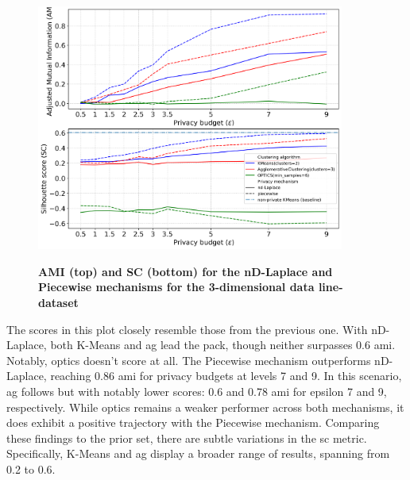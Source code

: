 \begin{figure}[H]
  \centering
  \caption{\textbf{AMI (top) and SC (bottom) for the nD-Laplace and Piecewise mechanisms for the 3-dimensional data line-dataset}}
  \includegraphics[width=0.9\textwidth]{Results/nd-laplace/nd-Laplace/line-dataset/ami-and-sc_3_dimensions.png}
  \label{fig:validation-line-dataset_comparison_3d-laplace}
\end{figure}
The scores in this plot closely resemble those from the previous one. With nD-Laplace, both K-Means and \gls{ag} lead the pack, though neither surpasses 0.6 \gls{ami}. Notably, \gls{optics} doesn't score at all.
The Piecewise mechanism outperforms nD-Laplace, reaching 0.86 \gls{ami} for privacy budgets at levels 7 and 9. In this scenario, \gls{ag} follows but with notably lower scores: 0.6 and 0.78 \gls{ami} for epsilon 7 and 9, respectively. While \gls{optics} remains a weaker performer across both mechanisms, it does exhibit a positive trajectory with the Piecewise mechanism.
Comparing these findings to the prior set, there are subtle variations in the \gls{sc} metric. Specifically, K-Means and \gls{ag} display a broader range of results, spanning from 0.2 to 0.6.
\newpage
